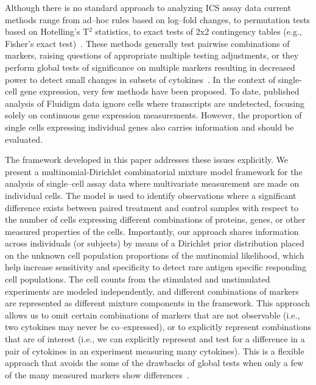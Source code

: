 \documentclass[11pt]{article}
\begin{document}
Although there is no standard approach to analyzing ICS assay data current methods range from ad--hoc rules based on log--fold changes, to permutation tests based on Hotelling's T$^2$ statistics, to exact tests of 2x2 contingency tables (e.g., Fisher's exact test)~\cite{Trigona:2003,Sinclair:2004hs,Horton:2007tsa,Nason:2006dx}. These methods generally test pairwise combinations of markers, raising questions of appropriate multiple testing adjustments, or they perform global tests of significance on multiple markers resulting in decreased power to detect small changes in subsets of cytokines~\cite{Proschan:2009ks,Nason:2006dx}. In the context of single-cell gene expression, very few methods have been proposed. To date, published analysis of Fluidigm data ignore cells where transcripts are undetected, focusing solely on continuous gene expression measurements. However, the proportion of single cells expressing individual genes also carries information and should be evaluated.



The framework developed in this paper addresses these issues explicitly. We present a multinomial-Dirichlet combinatorial mixture model framework for the analysis of single--cell assay data where multivariate measurement are made on individual cells. The model is used to identify observations where a significant difference exists between paired treatment and control samples with respect to the number of cells expressing  different combinations of proteins, genes, or other measured properties of the cells. Importantly, our approach shares information across individuals (or subjects) by means of a Dirichlet prior distribution placed on the unknown cell population proportions of the mutinomial likelihood, which help increase sensitivity and specificity to detect rare antigen specific responding cell populations. The cell counts from the stimulated and unstimulated experiments are modeled independently, and different combinations of markers are represented as different mixture components in the framework. This approach allows us to omit certain combinations of markers that are not observable (i.e., two cytokines may never be co--expressed), or to explicitly represent combinations that are of interest (i.e., we can explicitly represent and test for a difference in a pair of cytokines in an experiment measuring many cytokines). This is a flexible approach that avoids the some of the drawbacks of global tests when only a few of the many measured markers show differences~\cite{Nason:2006dx}.
\end{document}
